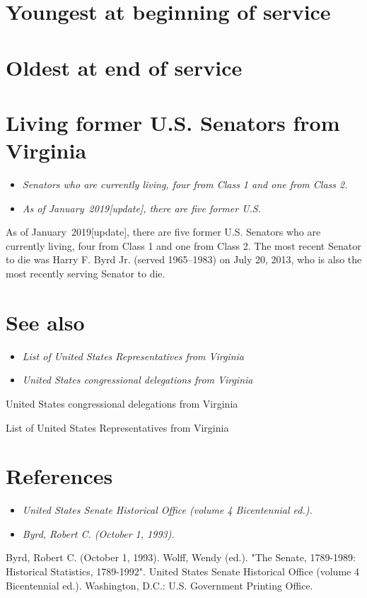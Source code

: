 \section{Youngest at beginning of
service}\label{youngest-at-beginning-of-service}

\section{Oldest at end of service}\label{oldest-at-end-of-service}

\section{Living former U.S. Senators from
Virginia}\label{living-former-u.s.-senators-from-virginia}

\begin{itemize}
\item
  \emph{Senators who are currently living, four from Class 1 and one
  from Class 2.}
\item
  \emph{As of January~2019{[}update{]}, there are five former U.S.}
\end{itemize}

As of January~2019{[}update{]}, there are five former U.S. Senators who
are currently living, four from Class 1 and one from Class 2. The most
recent Senator to die was Harry F. Byrd Jr. (served 1965--1983) on July
20, 2013, who is also the most recently serving Senator to die.

\section{See also}\label{see-also}

\begin{itemize}
\item
  \emph{List of United States Representatives from Virginia}
\item
  \emph{United States congressional delegations from Virginia}
\end{itemize}

United States congressional delegations from Virginia

List of United States Representatives from Virginia

\section{References}\label{references}

\begin{itemize}
\item
  \emph{United States Senate Historical Office (volume 4 Bicentennial
  ed.).}
\item
  \emph{Byrd, Robert C. (October 1, 1993).}
\end{itemize}

Byrd, Robert C. (October 1, 1993). Wolff, Wendy (ed.). "The Senate,
1789-1989: Historical Statistics, 1789-1992". United States Senate
Historical Office (volume 4 Bicentennial ed.). Washington, D.C.: U.S.
Government Printing Office.
